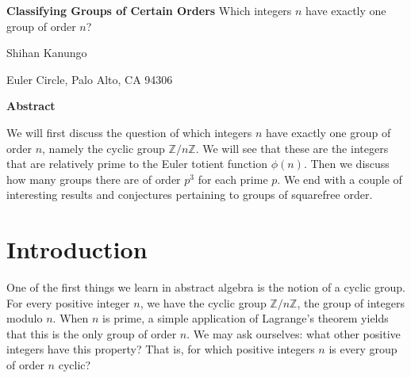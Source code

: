 \documentclass[12pt,reqno]{amsart}
\theoremstyle{plain}
\theoremstyle{definition}
\numberwithin{equation}{section}
\begin{document}
\newpage
\thispagestyle{empty}

\newpage 
\setlength{\parskip}{5pt}
\thispagestyle{empty}
\setcounter{page}{1}

\begin{center}
    {\LARGE \bf Classifying Groups of Certain Orders} 
    \vskip 5pt
    {\normalsize Which integers $n$ have exactly one group of order $n$?} 
    
    
    \vspace{0.3in}
    {\large  Shihan Kanungo} 
    
    \vspace{0.05in}
    {\small Euler Circle, Palo Alto, CA 94306}
\end{center}
\date{\today}

\vspace{0.2in}
\begin{center}
    {\bf Abstract}

\medskip
\begin{minipage}{12cm}
    {\footnotesize We will first discuss the question of which integers $n$ have exactly one group of order $n$, namely the cyclic group $\mathbb{Z}/n\mathbb{Z}$. We will see that these are the integers that are relatively prime to the Euler totient function $\phi(n)$. Then we discuss how many groups there are of order $p^3$ for each prime $p$. We end with a couple of interesting results and conjectures pertaining to groups of squarefree order.}
\end{minipage}
\end{center}

\setcounter{section}{0}

\vspace{5mm}
\section{Introduction}

One of the first things we learn in abstract algebra is the notion of a cyclic group. For every positive integer $n$, we have the cyclic group $\mathbb{Z}/n\mathbb{Z}$, the group of integers modulo $n$. When $n$ is prime, a simple application of Lagrange's theorem yields that this is the only group of order $n$. We may ask ourselves: what other positive integers have this property? That is, for which positive integers $n$ is every group of order $n$ cyclic?
\end{document}
